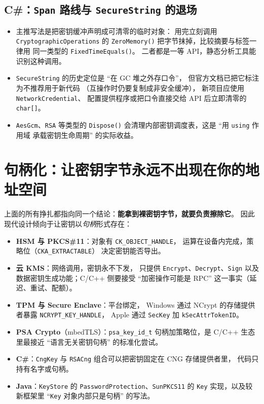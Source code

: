 \documentclass[12pt,a4paper,fontset=fandol]{ctexbook}
\newcommand{\Fn}[1]{\texttt{#1()}}
\newcommand{\Tp}[1]{\texttt{#1}}
\newcommand{\CSharp}{C\#}
\newcommand{\CppJava}{C/C++}
\begin{document}
\subsection{\CSharp{}：\Tp{Span} 路线与 \Tp{SecureString} 的退场}

\begin{itemize}
  \item 主推写法是把密钥缓冲声明成可清零的临时对象：
        用完立刻调用 \Tp{Cryptographic\allowbreak Operations} 的
        \Fn{ZeroMemory} 把字节抹掉，比较摘要与标签一律用
        同一类型的 \Fn{FixedTimeEquals}。
        二者都是一等 API，静态分析工具能识别这种调用。
  \item \Tp{SecureString} 的历史定位是 ``在 GC 堆之外存口令''，
        但官方文档已把它标注为不推荐用于新代码
        （互操作时仍要复制成非安全缓冲），
        新项目应使用 \Tp{NetworkCredential}、
        配置提供程序或把口令直接交给 API 后立即清零的 \Tp{char[]}。
  \item \Tp{AesGcm}、\Tp{RSA} 等类型的 \Fn{Dispose}
        会清理内部密钥调度表，这是 ``用 \Tp{using} 作用域
        承载密钥生命周期'' 的实际收益。
\end{itemize}

\section{句柄化：让密钥字节永远不出现在你的地址空间}

上面的所有挣扎都指向同一个结论：\textbf{能拿到裸密钥字节，就要负责擦除它}。
因此现代设计倾向于让密钥以\emph{句柄}形式存在：

\begin{itemize}
  \item \textbf{HSM 与 PKCS\#11}：对象有 \Tp{CK\_OBJECT\_HANDLE}，
        运算在设备内完成，策略位（\Tp{CKA\_EXTRACTABLE}）
        决定密钥能否导出。
  \item \textbf{云 KMS}：网络调用，密钥永不下发，
        只提供 \texttt{Encrypt}、\texttt{Decrypt}、\texttt{Sign}
        以及数据密钥生成功能；\CppJava{} 侧要接受
        ``加密操作可能是 RPC'' 这一事实（延迟、重试、配额）。
  \item \textbf{TPM 与 Secure Enclave}：平台绑定，
        Windows 通过 NCrypt 的存储提供者暴露
        \Tp{NCRYPT\_KEY\_HANDLE}，
        Apple 通过 \Tp{SecKey} 加 \Tp{kSecAttrTokenID}。
  \item \textbf{PSA Crypto}（mbedTLS）：\Tp{psa\_key\_id\_t}
        句柄加策略位，是 \CppJava{} 生态里最接近
        ``语言无关密钥句柄'' 的标准化尝试。
  \item \textbf{\CSharp{}}：\Tp{CngKey}
        与 \Tp{RSACng} 组合可以把密钥固定在 CNG 存储提供者里，
        代码只持有名字或句柄。
  \item \textbf{Java}：\Tp{KeyStore} 的
        \Tp{PasswordProtection}、\Tp{SunPKCS11} 的
        \Tp{Key} 实现，以及较新框架里
        ``\Tp{Key} 对象内部只是句柄'' 的写法。
\end{itemize}
\end{document}
